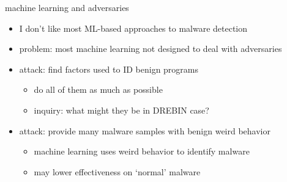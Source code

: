 \begin{frame}{machine learning and adversaries}
    \begin{itemize}
    \item I don't like most ML-based approaches to malware detection
    \vspace{.5cm}
    \item problem: most machine learning not designed to deal with adversaries
    \item attack: find factors used to ID benign programs
        \begin{itemize}
        \item do all of them as much as possible
        \item inquiry: what might they be in DREBIN case?
        \end{itemize}
    \item attack: provide many malware samples with benign weird behavior
        \begin{itemize}
        \item machine learning uses weird behavior to identify malware
        \item may lower effectiveness on `normal' malware
        \end{itemize}
    \end{itemize}
\end{frame}
